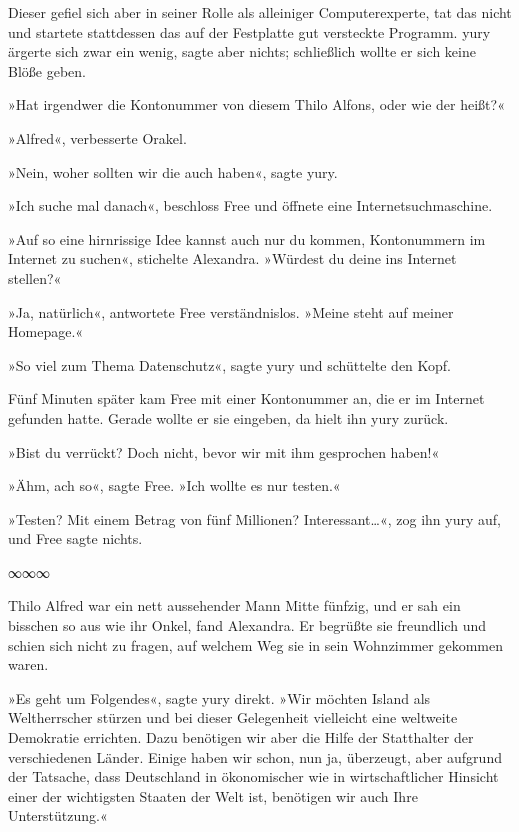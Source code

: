 Dieser gefiel sich aber in seiner Rolle als alleiniger Computerexperte, tat das nicht und startete stattdessen das auf der Festplatte gut versteckte Programm. yury ärgerte sich zwar ein wenig, sagte aber nichts; schließlich wollte er sich keine Blöße geben.

»Hat irgendwer die Kontonummer von diesem Thilo Alfons, oder wie der heißt?«

»Alfred«, verbesserte Orakel.

»Nein, woher sollten wir die auch haben«, sagte yury.

»Ich suche mal danach«, beschloss Free und öffnete eine Internetsuchmaschine.

»Auf so eine hirnrissige Idee kannst auch nur du kommen, Kontonummern im Internet zu suchen«, stichelte Alexandra. »Würdest du deine ins Internet stellen?«

»Ja, natürlich«, antwortete Free verständnislos. »Meine steht auf meiner Homepage.«

»So viel zum Thema Datenschutz«, sagte yury und schüttelte den Kopf.

Fünf Minuten später kam Free mit einer Kontonummer an, die er im Internet gefunden hatte. Gerade wollte er sie eingeben, da hielt ihn yury zurück.

»Bist du verrückt? Doch nicht, bevor wir mit ihm gesprochen haben!«

»Ähm, ach so«, sagte Free. »Ich wollte es nur testen.«

»Testen? Mit einem Betrag von fünf Millionen? Interessant…«, zog ihn yury auf, und Free sagte nichts.

\begin{center}
    ∞∞∞
\end{center}

Thilo Alfred war ein nett aussehender Mann Mitte fünfzig, und er sah ein bisschen so aus wie ihr Onkel, fand Alexandra. Er begrüßte sie freundlich und schien sich nicht zu fragen, auf welchem Weg sie in sein Wohnzimmer gekommen waren.

»Es geht um Folgendes«, sagte yury direkt. »Wir möchten Island als Weltherrscher stürzen und bei dieser Gelegenheit vielleicht eine weltweite Demokratie errichten. Dazu benötigen wir aber die Hilfe der Statthalter der verschiedenen Länder. Einige haben wir schon, nun ja, überzeugt, aber aufgrund der Tatsache, dass Deutschland in ökonomischer wie in wirtschaftlicher Hinsicht einer der wichtigsten Staaten der Welt ist, benötigen wir auch Ihre Unterstützung.«

